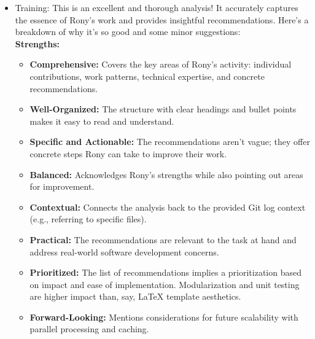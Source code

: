 \documentclass{article}
\begin{document}
\begin{itemize}
\begin{itemize}
\begin{itemize}
            \item Training: This is an excellent and thorough analysis! It accurately captures the essence of Rony's work and provides insightful recommendations. Here's a breakdown of why it's so good and some minor suggestions:\\
\textbf{Strengths:}
            \begin{itemize}
                \item \textbf{Comprehensive:} Covers the key areas of Rony's activity: individual contributions, work patterns, technical expertise, and concrete recommendations.
                \item \textbf{Well-Organized:} The structure with clear headings and bullet points makes it easy to read and understand.
                \item \textbf{Specific and Actionable:} The recommendations aren't vague; they offer concrete steps Rony can take to improve their work.
                \item \textbf{Balanced:} Acknowledges Rony's strengths while also pointing out areas for improvement.
                \item \textbf{Contextual:} Connects the analysis back to the provided Git log context (e.g., referring to specific files).
                \item \textbf{Practical:} The recommendations are relevant to the task at hand and address real-world software development concerns.
                \item \textbf{Prioritized:} The list of recommendations implies a prioritization based on impact and ease of implementation. Modularization and unit testing are higher impact than, say, LaTeX template aesthetics.
                \item \textbf{Forward-Looking:} Mentions considerations for future scalability with parallel processing and caching.


\end{itemize}
\end{itemize}
\end{itemize}
\end{itemize}
\end{document}
